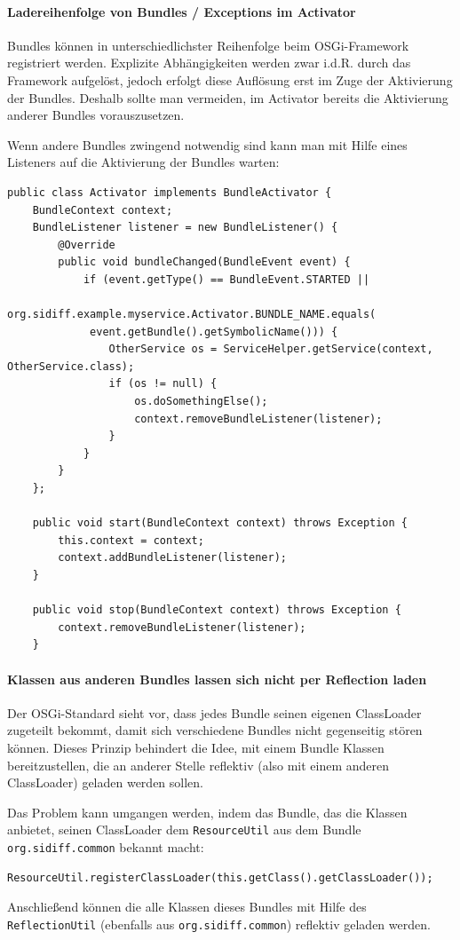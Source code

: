 \documentclass[10pt,a4paper]{scrartcl}
\begin{document}
\paragraph{Ladereihenfolge von Bundles / Exceptions im Activator} Bundles können
in unterschiedlichster Reihenfolge beim OSGi-Framework registriert werden.
Explizite Abhängigkeiten werden zwar i.d.R. durch das Framework aufgelöst,
jedoch erfolgt diese Auflösung erst im Zuge der Aktivierung der Bundles. Deshalb
sollte man vermeiden, im Activator bereits die Aktivierung anderer Bundles
vorauszusetzen.

Wenn andere Bundles zwingend notwendig sind kann man mit Hilfe eines Listeners
auf die Aktivierung der Bundles warten:
\begin{lstlisting}
public class Activator implements BundleActivator {
	BundleContext context;
	BundleListener listener = new BundleListener() {
		@Override
		public void bundleChanged(BundleEvent event) {
			if (event.getType() == BundleEvent.STARTED ||
			 org.sidiff.example.myservice.Activator.BUNDLE_NAME.equals(
			 event.getBundle().getSymbolicName())) {
				OtherService os = ServiceHelper.getService(context, OtherService.class);
				if (os != null) {
					os.doSomethingElse();
					context.removeBundleListener(listener);
				}
			}
		}
	};
	
	public void start(BundleContext context) throws Exception {
		this.context = context;
		context.addBundleListener(listener);
	}

	public void stop(BundleContext context) throws Exception {
		context.removeBundleListener(listener);
	}

\end{lstlisting}

\paragraph{Klassen aus anderen Bundles lassen sich nicht per Reflection laden}
Der OSGi-Standard sieht vor, dass jedes Bundle seinen eigenen ClassLoader
zugeteilt bekommt, damit sich verschiedene Bundles nicht gegenseitig stören
können. Dieses Prinzip behindert die Idee, mit einem Bundle Klassen
bereitzustellen, die an anderer Stelle reflektiv (also mit einem anderen
ClassLoader) geladen werden sollen. 

Das Problem kann umgangen werden, indem das Bundle, das die Klassen anbietet,
seinen ClassLoader dem \texttt{ResourceUtil} aus dem Bundle
\texttt{org.sidiff.common} bekannt macht: 
\begin{lstlisting}
ResourceUtil.registerClassLoader(this.getClass().getClassLoader());
\end{lstlisting}
Anschließend können die alle Klassen dieses Bundles mit Hilfe des
\texttt{ReflectionUtil} (ebenfalls aus \texttt{org.sidiff.common}) reflektiv
geladen werden.
\end{document}
